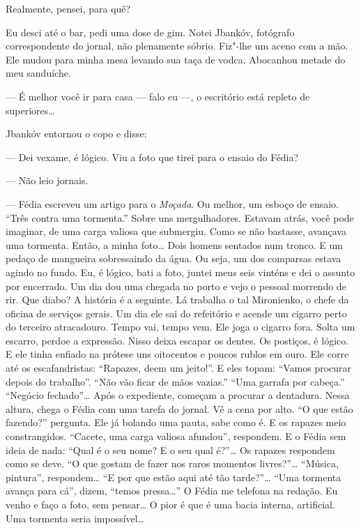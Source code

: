 Realmente, pensei, para quê?

Eu desci até o bar, pedi uma dose de gim. Notei Jbankóv, fotógrafo
correspondente do jornal, não plenamente sóbrio. Fiz"-lhe um aceno com a
mão. Ele mudou para minha mesa levando sua taça de vodca. Abocanhou
metade do meu sanduíche.

--- É melhor você ir para casa --- falo eu ---, o escritório está
repleto de superiores\ldots{}

Jbankóv entornou o copo e disse:

--- Dei vexame, é lógico. Viu a foto que tirei para o ensaio do Fédia?

--- Não leio jornais.

--- Fédia escreveu um artigo para o \emph{Moçada}. Ou melhor, um esboço
de ensaio. ``Três contra uma tormenta.'' Sobre uns
mergulhadores. Estavam atrás, você pode imaginar, de uma carga valiosa
que submergiu. Como se não bastasse, avançava uma tormenta. Então, a
minha foto\ldots{} Dois homens sentados num tronco. E um pedaço de mangueira
sobressaindo da água. Ou seja, um dos comparsas estava agindo no fundo.
Eu, é lógico, bati a foto, juntei meus seis vinténs e dei o assunto por
encerrado. Um dia dou uma chegada no porto e vejo o pessoal morrendo de
rir. Que diabo? A história é a seguinte. Lá trabalha o tal Mironienko, o
chefe da oficina de serviços gerais. Um dia ele sai do refeitório e
acende um cigarro perto do terceiro atracadouro. Tempo vai, tempo vem.
Ele joga o cigarro fora. Solta um escarro, perdoe a expressão. Nisso
deixa escapar os dentes. Os postiços, é lógico. E ele tinha enfiado na
prótese uns oitocentos e poucos rublos em ouro. Ele corre até os
escafandristas: ``Rapazes, deem um jeito!''. E eles topam: ``Vamos
procurar depois do trabalho''. ``Não vão ficar de mãos vazias.'' ``Uma
garrafa por cabeça.'' ``Negócio fechado''\ldots{} Após o expediente, começam
a procurar a dentadura. Nessa altura, chega o Fédia com uma tarefa do
jornal. Vê a cena por alto. ``O que estão fazendo?'' pergunta. Ele já
bolando uma pauta, sabe como é. E os rapazes meio constrangidos.
``Cacete, uma carga valiosa afundou'', respondem. E o Fédia sem ideia de
nada: ``Qual é o seu nome? E o seu qual é?''\ldots{} Os rapazes respondem
como se deve. ``O que gostam de fazer nos raros momentos livres?''\ldots{}
``Música, pintura'', respondem\ldots{} ``E por que estão aqui até tão
tarde?''\ldots{} ``Uma tormenta avança para cá'', dizem, ``temos pressa\ldots{}''
O Fédia me telefona na redação. Eu venho e faço a foto, sem pensar\ldots{} O
pior é que é uma bacia interna, artificial. Uma tormenta seria
impossível\ldots{}

